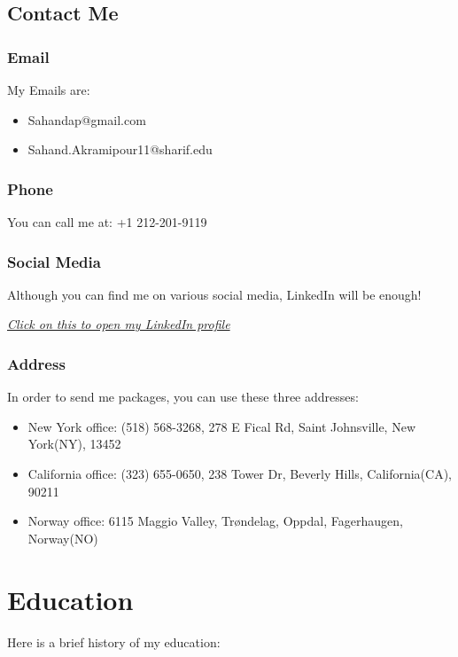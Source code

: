 \documentclass[12pt,a4paper]{report}
\begin{document}
\section{Contact Me}
\subsection{Email}
My Emails are:
\begin{itemize}
\item 
Sahandap@gmail.com
\item
Sahand.Akramipour11@sharif.edu
\end{itemize}

\subsection{Phone}
You can call me at: +1 212-201-9119

\subsection{Social Media}
Although you can find me on various social media, LinkedIn will be enough!
\begin{center}
\href{https://www.linkedin.com/in/sahand-akramipour-383995259/?lipi=urn%3Ali%3Apage%3Aprofile_common_profile_index%3Ba40b2a48-0dad-4638-9308-fb08d99a1a77"}{\it{Click on this to open my LinkedIn profile}}
\end{center}

\subsection{Address}

In order to send me packages, you can use these three addresses:

\begin{itemize}
\item
New York office: (518) 568-3268, 278 E Fical Rd, Saint Johnsville, New York(NY), 13452
\item
California office: (323) 655-0650, 238 Tower Dr, Beverly Hills, California(CA), 90211
\item
Norway office: 6115 Maggio Valley, Trøndelag, Oppdal, Fagerhaugen, Norway(NO)
\end{itemize}

\chapter{Education}
Here is a brief history of my education:
\end{document}
